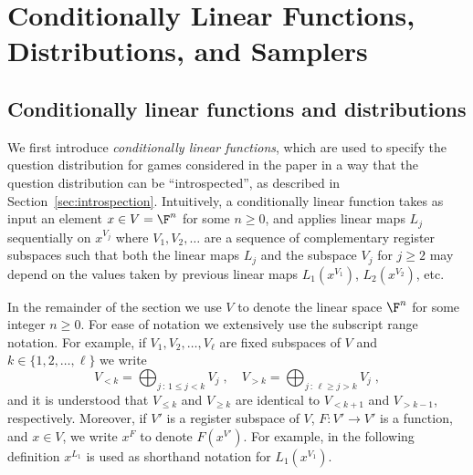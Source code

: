\section{Conditionally Linear Functions, Distributions, and Samplers}
\label{sec:linear}

\subsection{Conditionally linear functions and distributions}
\label{sec:cl}

We first introduce \emph{conditionally linear functions}, which are used to
specify the question distribution for games considered in the paper in a way
that the question distribution can be ``introspected'', as described in
Section~\ref{sec:introspection}.
Intuitively, a conditionally linear function takes as input an element
$x\in V = \F^n$ for some $n\geq 0$, and applies linear maps $L_j$ sequentially
on $x^{V_j}$ where $V_1,V_2,\ldots $ are a sequence of complementary register
subspaces such that both the linear maps $L_j$ and the subspace $V_j$ for
$j \ge 2$ may depend on the values taken by previous linear maps $L_1(x^{V_1})$,
$L_2(x^{V_2})$, etc.

In the remainder of the section we use $V$ to denote the linear space $\F^n$ for
some integer $n \geq 0$.
For ease of notation we extensively use the subscript range notation.
For example, if $V_1, V_2, \ldots, V_\ell$ are fixed subspaces of $V$ and $k \in
\{1, 2, \ldots, \ell\}$ we write
\begin{equation*}
  V_{<k} = \bigoplus_{j\,:\,1 \le j<k} V_j\;,\quad
  V_{> k} = \bigoplus_{j\,:\, \ell\ge j > k} V_j\;,
\end{equation*}
and it is understood that $V_{\le k}$ and $V_{\ge k}$ are identical to
$V_{<k+1}$ and $V_{>k-1}$, respectively.
Moreover, if $V'$ is a register subspace of $V$, $F: V' \to V'$ is a function,
and $x \in V$, we write $x^F$ to denote $F(x^{V'})$.
For example, in the following definition $x^{L_1}$ is used as shorthand notation
for $L_1(x^{V_1})$.


